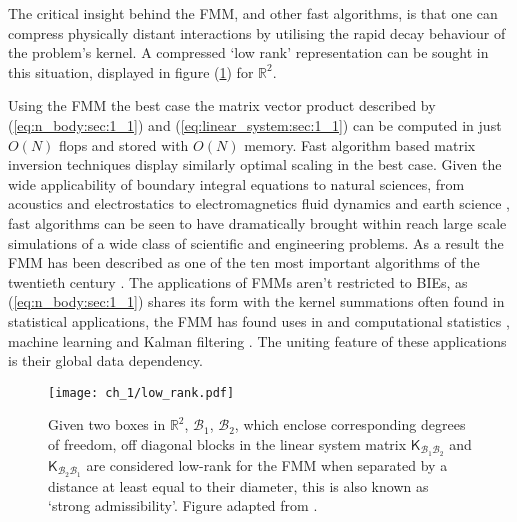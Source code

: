 The critical insight behind the FMM, and other fast algorithms, is that one can compress physically distant interactions by utilising the rapid decay behaviour of the problem's kernel. A compressed `low rank' representation can be sought in this situation, displayed in figure (\ref{fig:low_rank:sec_1_1}) for $\mathbb{R}^2$.

Using the FMM the best case the matrix vector product described by (\ref{eq:n_body:sec:1_1}) and (\ref{eq:linear_system:sec:1_1}) can be computed in just $O(N)$ flops and stored with $O(N)$ memory. Fast algorithm based matrix inversion techniques display similarly optimal scaling in the best case. Given the wide applicability of boundary integral equations to natural sciences, from acoustics \cite{wolf2011aeroacoustic,hao2015efficient} and electrostatics \cite{wang2021high} to electromagnetics \cite{darve2004fast} fluid dynamics \cite{rahimian2010petascale} and earth science \cite{chaillat2008multi}, fast algorithms can be seen to have dramatically brought within reach large scale simulations of a wide class of scientific and engineering problems. As a result the FMM has been described as one of the ten most important algorithms of the twentieth century \cite{cipra2000best}. The applications of FMMs aren't restricted to BIEs, as (\ref{eq:n_body:sec:1_1}) shares its form with the kernel summations often found in statistical applications, the FMM has found uses in and computational statistics \cite{ambikasaran2013large}, machine learning \cite{lee2012distributed} and Kalman filtering \cite{li2014kalman}. The uniting feature of these applications is their global data dependency. 

\begin{figure}
    \centering
    \texttt{[image: ch\_1/low\_rank.pdf]}
    \caption{Given two boxes in $\mathbb{R}^2$, $\mathcal{B}_1$, $\mathcal{B}_2$, which enclose corresponding degrees of freedom, off diagonal blocks in the linear system matrix $\mathsf{K}_{\mathcal{B}_1\mathcal{B}_2}$ and $\mathsf{K}_{\mathcal{B}_2\mathcal{B}_1}$ are considered low-rank for the FMM when separated by a distance at least equal to their diameter, this is also known as `strong admissibility'. Figure adapted from \cite{minden2017recursive}.}
    \label{fig:low_rank:sec_1_1}
\end{figure}

